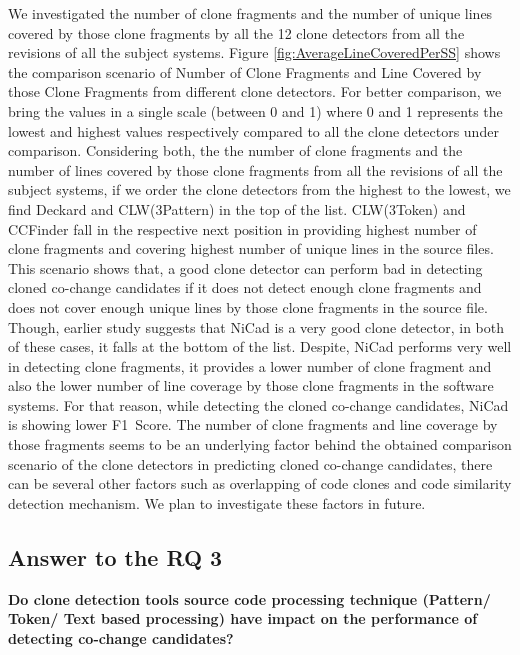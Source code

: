 \documentclass[review]{elsarticle}
\begin{document}
We investigated the number of clone fragments and the number of unique lines covered by those clone fragments by all the 12 clone detectors from all the revisions of all the subject systems. Figure \ref{fig:AverageLineCoveredPerSS}  shows the comparison scenario of Number of Clone Fragments and Line Covered by those Clone Fragments from different clone detectors. For better comparison, we bring the values in a single scale (between 0 and 1) where 0 and 1 represents the lowest and highest values respectively compared to all the clone detectors under comparison. Considering both, the the number of clone fragments and the number of lines covered by those clone fragments from all the revisions of all the subject systems, if we order the clone detectors from the highest to the lowest, we find Deckard and CLW(3Pattern) in the top of the list. CLW(3Token) and CCFinder fall in the respective next position in providing highest number of clone fragments and covering highest number of unique lines in the source files. This scenario shows that, a good clone detector can perform bad in detecting cloned co-change candidates if it does not detect enough clone fragments and does not cover enough unique lines by those clone fragments in the source file. Though, earlier study \cite{Mondal-2014-PRC-2597073-2597104rankingCoChange} suggests that NiCad is a very good clone detector, in both of these cases, it falls at the bottom of the list. Despite, NiCad performs very well in detecting clone fragments, it provides a lower number of clone fragment and also the lower number of line coverage by those clone fragments in the software systems. For that reason, while detecting the cloned co-change candidates, NiCad is showing lower F1~Score. The number of clone fragments and line coverage by those fragments seems to be an underlying factor behind the obtained comparison scenario of the clone detectors in predicting cloned co-change candidates, there can be several other factors such as overlapping of code clones and code similarity detection mechanism. We plan to investigate these factors in future.

\subsection{Answer to the \textbf{RQ 3}}
\textbf{Do clone detection tools source code processing technique (Pattern/ Token/ Text based processing) have impact on the performance of detecting co-change candidates?}
\end{document}
